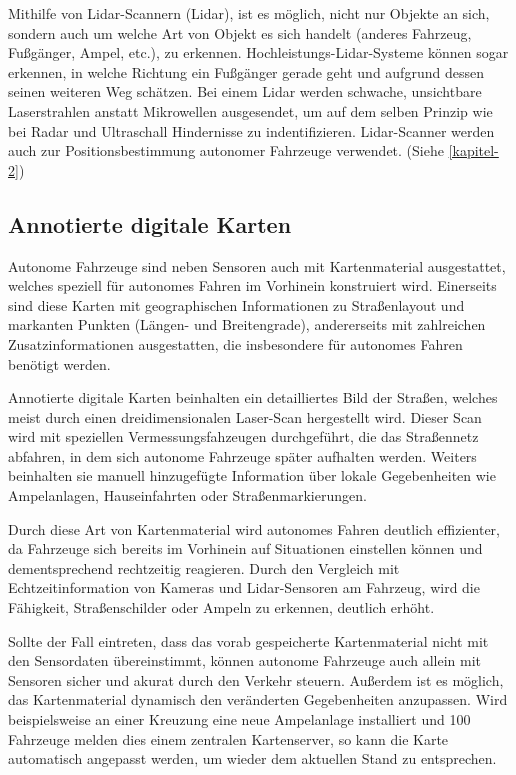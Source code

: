 Mithilfe von \acs{Lidar}-Scannern (\acl{Lidar}), ist es möglich, nicht nur Objekte an sich, sondern auch um welche Art von Objekt es sich handelt (anderes Fahrzeug, Fußgänger, Ampel, etc.), zu erkennen. Hochleistungs-\acs{Lidar}-Systeme können sogar erkennen, in welche Richtung ein Fußgänger gerade geht und aufgrund dessen seinen weiteren Weg schätzen.  Bei einem \acs{Lidar} werden schwache, unsichtbare Laserstrahlen anstatt Mikrowellen ausgesendet, um auf dem selben Prinzip wie bei \acs{Radar} und Ultraschall Hindernisse zu indentifizieren. \acs{Lidar}-Scanner werden auch zur Positionsbestimmung autonomer Fahrzeuge verwendet. (Siehe \ref{kapitel-2})

\subsection{Annotierte digitale Karten}\label{maps}

Autonome Fahrzeuge sind neben Sensoren auch mit Kartenmaterial ausgestattet, welches speziell für autonomes Fahren im Vorhinein konstruiert wird. Einerseits sind diese Karten mit geographischen Informationen zu Straßenlayout und markanten Punkten (Längen- und Breitengrade), andererseits mit zahlreichen Zusatzinformationen ausgestatten, die insbesondere für autonomes Fahren benötigt werden. 

Annotierte digitale Karten beinhalten ein detailliertes Bild der Straßen, welches meist durch einen dreidimensionalen Laser-Scan hergestellt wird. Dieser Scan wird mit speziellen Vermessungsfahzeugen durchgeführt, die das Straßennetz abfahren, in dem sich autonome Fahrzeuge später aufhalten werden.
Weiters beinhalten sie manuell hinzugefügte Information über lokale Gegebenheiten wie Ampelanlagen, Hauseinfahrten oder Straßenmarkierungen. 

Durch diese Art von Kartenmaterial wird autonomes Fahren deutlich effizienter, da Fahrzeuge sich bereits im Vorhinein auf Situationen einstellen können und dementsprechend rechtzeitig reagieren. Durch den Vergleich mit Echtzeitinformation von Kameras und \acs{Lidar}-Sensoren am Fahrzeug, wird die Fähigkeit, Straßenschilder oder Ampeln zu erkennen, deutlich erhöht. 

Sollte der Fall eintreten, dass das vorab gespeicherte Kartenmaterial nicht mit den Sensordaten übereinstimmt, können autonome Fahrzeuge auch allein mit Sensoren sicher und akurat durch den Verkehr steuern. Außerdem ist es möglich, das Kartenmaterial dynamisch den veränderten Gegebenheiten anzupassen. Wird beispielsweise an einer Kreuzung eine neue Ampelanlage installiert und 100 Fahrzeuge melden dies einem zentralen Kartenserver, so kann die Karte automatisch angepasst werden, um wieder dem aktuellen Stand zu entsprechen. 

